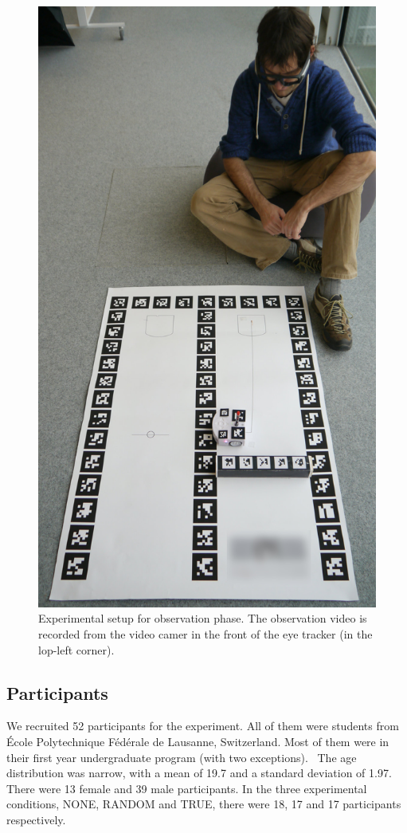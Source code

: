 \documentclass{sig-alternate}
\begin{document}
\begin{figure}
    \centering
    \includegraphics[width=0.9\linewidth]{setup0}
    \caption{\small Experimental setup for observation phase. The observation
    video is recorded from the video camer in the front of the eye tracker (in
    the lop-left corner).}

    \label{expe}
\end{figure}

\subsection{Participants}

We recruited 52 participants for the experiment. All of them were
students from École Polytechnique Fédérale de Lausanne, Switzerland.
Most of them were in their first year undergraduate program (with two
exceptions). ~The age distribution was narrow, with a mean of 19.7 and a
standard deviation of 1.97. There were 13 female and 39 male
participants. In the three experimental conditions, NONE, RANDOM and
TRUE, there were 18, 17 and 17 participants respectively.
\end{document}
